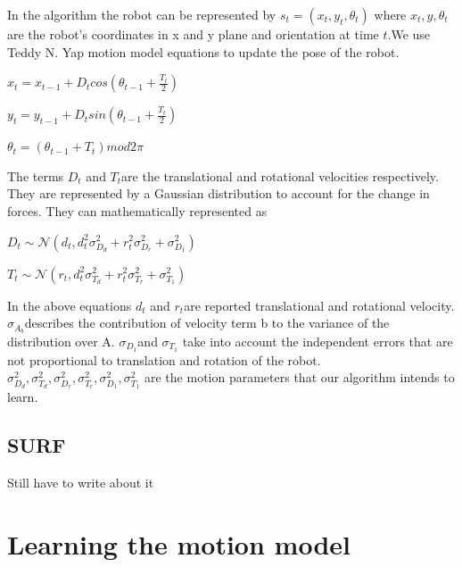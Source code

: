 \documentclass[12pt]{dalcsthesis}
\begin{document}
In the algorithm the robot can be represented by $s_{t}=(x_{t},y_{t},\theta_{t})$
where $x_{t},y,\theta_{t}$ are the robot's coordinates in x and y
plane and orientation at time $t$.We use Teddy N. Yap motion model
equations to update the pose of the robot.

$x_{t}=x_{t-1}+D_{t}cos(\theta_{t-1}+\frac{T_{t}}{2})$

$y_{t}=y_{t-1}+D_{t}sin(\theta_{t-1}+\frac{T_{t}}{2})$

$\theta_{t}=(\theta_{t-1}+T_{t})mod2\pi$


The terms $D_{t}$ and $T_{t}$are the translational and rotational
velocities respectively. They are represented by a Gaussian distribution
to account for the change in forces. They can mathematically represented
as 

$D_{t}\sim\mathcal{{N}}(d_{t},d_{t}^{2}\sigma_{D_{d}}^{2}+r_{t}^{2}\sigma_{D_{r}}^{2}+\sigma_{D_{1}}^{2})$

$T_{t}\sim\mathcal{{N}}(r_{t},d_{t}^{2}\sigma_{T_{d}}^{2}+r_{t}^{2}\sigma_{T_{r}}^{2}+\sigma_{T_{1}}^{2})$

In the above equations $d_{t}$ and $r_{t}$are reported translational
and rotational velocity. $\sigma_{A_{b}}$describes the contribution
of velocity term b to the variance of the distribution over A. $\sigma_{D_{1}}$and
$\sigma_{T_{1}}$ take into account the independent errors that are
not proportional to translation and rotation of the robot. $\sigma_{D_{d}}^{2}\ensuremath{,}\sigma_{T_{d}}^{2}\ensuremath{,}\sigma_{D_{r}}^{2}\ensuremath{,}\sigma_{T_{r}}^{2}\ensuremath{,}\sigma_{D_{1}}^{2}\ensuremath{,}\sigma_{T_{1}}^{2}$
are the motion parameters that our algorithm intends to learn. 
 

\section{SURF}
Still have to write about it

\chapter{Learning the motion model}
\end{document}

